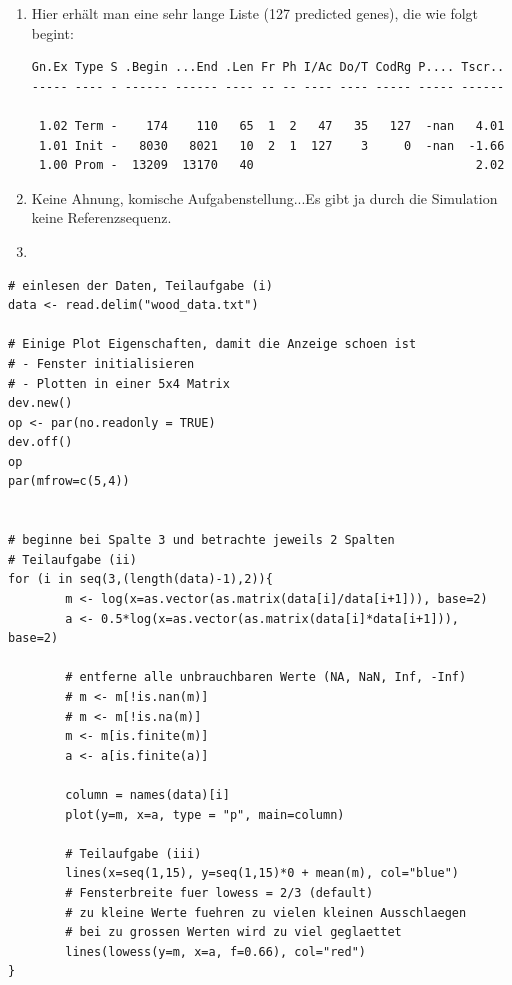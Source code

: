 \documentclass{homework}
\begin{document}
\begin{enumerate}
\begin{enumerate}
\item 
Hier erhält man eine sehr lange Liste (127 predicted genes), die wie folgt begint:
\begin{verbatim}
Gn.Ex Type S .Begin ...End .Len Fr Ph I/Ac Do/T CodRg P.... Tscr..
----- ---- - ------ ------ ---- -- -- ---- ---- ----- ----- ------

 1.02 Term -    174    110   65  1  2   47   35   127  -nan   4.01
 1.01 Init -   8030   8021   10  2  1  127    3     0  -nan  -1.66
 1.00 Prom -  13209  13170   40                               2.02
\end{verbatim}
\item 
Keine Ahnung, komische Aufgabenstellung...Es gibt ja durch die Simulation keine Referenzsequenz. 
\item 
\end{enumerate}


\begin{verbatim}
# einlesen der Daten, Teilaufgabe (i)
data <- read.delim("wood_data.txt")

# Einige Plot Eigenschaften, damit die Anzeige schoen ist
# - Fenster initialisieren
# - Plotten in einer 5x4 Matrix
dev.new()
op <- par(no.readonly = TRUE)
dev.off()
op
par(mfrow=c(5,4))


# beginne bei Spalte 3 und betrachte jeweils 2 Spalten
# Teilaufgabe (ii)
for (i in seq(3,(length(data)-1),2)){
		m <- log(x=as.vector(as.matrix(data[i]/data[i+1])), base=2)
		a <- 0.5*log(x=as.vector(as.matrix(data[i]*data[i+1])), base=2)
	
		# entferne alle unbrauchbaren Werte (NA, NaN, Inf, -Inf)
		# m <- m[!is.nan(m)]
		# m <- m[!is.na(m)]
		m <- m[is.finite(m)]
		a <- a[is.finite(a)]
		
		column = names(data)[i]				
		plot(y=m, x=a, type = "p", main=column)	

        # Teilaufgabe (iii)
		lines(x=seq(1,15), y=seq(1,15)*0 + mean(m), col="blue")
		# Fensterbreite fuer lowess = 2/3 (default)
		# zu kleine Werte fuehren zu vielen kleinen Ausschlaegen
		# bei zu grossen Werten wird zu viel geglaettet
		lines(lowess(y=m, x=a, f=0.66), col="red")
}
\end{verbatim}


\end{enumerate}
\end{document}
